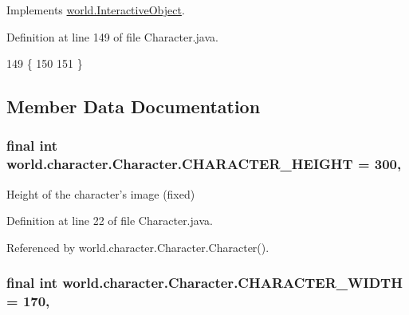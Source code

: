 Implements \hyperlink{interfaceworld_1_1_interactive_object_a841a0e3dba2416de9a7d12c73725ec0d}{world.\-Interactive\-Object}.



Definition at line 149 of file Character.\-java.


\begin{DoxyCode}
149                                 \{
150 
151     \}
\end{DoxyCode}


\subsection{Member Data Documentation}
\hypertarget{classworld_1_1character_1_1_character_a31596c03022d61aeb8aac56f149309be}{
\subsubsection[{C\-H\-A\-R\-A\-C\-T\-E\-R\-\_\-\-H\-E\-I\-G\-H\-T}]{\setlength{\rightskip}{0pt plus 5cm}final int world.\-character.\-Character.\-C\-H\-A\-R\-A\-C\-T\-E\-R\-\_\-\-H\-E\-I\-G\-H\-T = 300\hspace{0.3cm}{\ttfamily [static]}, {\ttfamily [protected]}}}\label{classworld_1_1character_1_1_character_a31596c03022d61aeb8aac56f149309be}


Height of the character's image (fixed) 



Definition at line 22 of file Character.\-java.



Referenced by world.\-character.\-Character.\-Character().

\hypertarget{classworld_1_1character_1_1_character_a2a46ba03b3e10896b7757f891336e8b8}{
\subsubsection[{C\-H\-A\-R\-A\-C\-T\-E\-R\-\_\-\-W\-I\-D\-T\-H}]{\setlength{\rightskip}{0pt plus 5cm}final int world.\-character.\-Character.\-C\-H\-A\-R\-A\-C\-T\-E\-R\-\_\-\-W\-I\-D\-T\-H = 170\hspace{0.3cm}{\ttfamily [static]}, {\ttfamily [protected]}}}\label{classworld_1_1character_1_1_character_a2a46ba03b3e10896b7757f891336e8b8}


